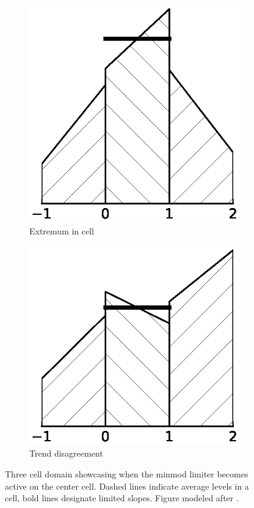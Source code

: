 \begin{figure}
\begin{subfigure}{0.27\textwidth}
    \includegraphics[width=\textwidth]{figures/minmod-b}
    \caption{Extremum in cell}
    \label{fig:minmod-extremum}
  \end{subfigure}
  \hfill
  \begin{subfigure}{0.27\textwidth}
    \centering
    \includegraphics[width=\textwidth]{figures/minmod-c}
    \caption{Trend disagreement}
    \label{fig:minmod-trend}
  \end{subfigure}
  \caption{Three cell domain showcasing when the minmod limiter becomes active on the center cell. Dashed lines indicate average levels in a cell, bold lines designate limited slopes. Figure modeled after \cite[Figure 3]{VanLeer1979}.}
  \label{fig:minmod}
\end{figure}

